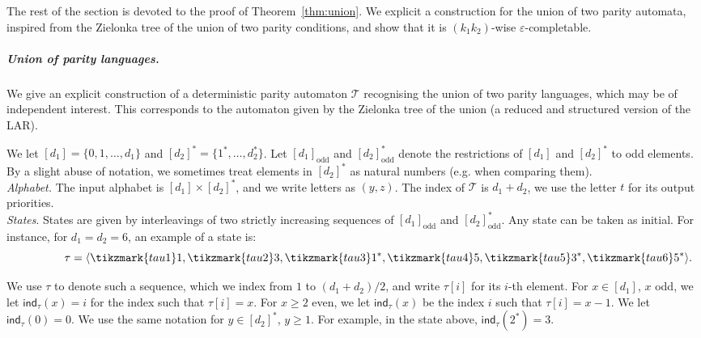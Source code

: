 \documentclass[a4paper,UKenglish,cleveref, thm-restate]{lipics-v2021}
\newcommand{\eps}{\varepsilon}
\newcommand{\T}{\mathcal T}
\newcommand{\done}{[d_1]}
\newcommand{\dtwo}{[d_2]^*}
\newcommand{\doneodd}{[d_1]_{\mathrm{odd}}}
\newcommand{\dtwoodd}{[d_2]^*_{\mathrm{odd}}}
\newcommand{\indtau}[1]{\mathsf{ind}_\tau(#1)}
\begin{document}
The rest of the section is devoted to the proof of Theorem~\ref{thm:union}.
We explicit a construction for the union of two parity automata, inspired from the Zielonka tree of the union of two parity conditions, and show that it is $(k_1 k_2)$-wise $\eps$-completable.



\subparagraph{Union of parity languages.} We give an explicit construction of a deterministic parity automaton $\mathcal{T}$ recognising the union of two parity languages, which may be of independent interest.  This corresponds to the automaton given by the Zielonka tree of the union (a reduced and structured version of the LAR).

We let $\done = \{0, 1,\dots,d_1\}$  and $\dtwo= \{1^*,\dots,d_2^*\}$.
Let $\doneodd$ and $\dtwoodd$ denote the restrictions of $\done$ and $\dtwo$ to odd elements.
By a slight abuse of notation, we sometimes treat elements in $\dtwo$ as natural numbers (e.g. when comparing them).\\

\textit{Alphabet.} 
The input alphabet is $\done \times \dtwo$, and we write letters as $(y,z)$. 
The index of $\T$  is $d_1 + d_2$, we use the letter $t$ for its output priorities.\\


\textit{States}. 
States are given by interleavings of two strictly increasing sequences of $\doneodd$ and $\dtwoodd$. Any state can be taken as initial. For instance, for $d_1=d_2=6$, an example of a state is:\\[-4mm]
\[  \hspace{15mm} \tau = \langle \tikzmark{tau1}1,\tikzmark{tau2}3,\tikzmark{tau3}1^*,\tikzmark{tau4}5, \tikzmark{tau5}3^*, \tikzmark{tau6}5^* \rangle .\]




\vspace{-2.5mm}

We use $\tau$ to denote such a sequence, which we index from $1$ to $(d_1+d_2)/2$, and write $\tau[i]$ for its $i$-th element.
For $x\in \done$, $x$ odd,  we let $\indtau{x} = i$ for the index such that $\tau[i]=x$. For $x\geq 2$ even, we let $\indtau{x}$ be the index $i$ such that $\tau[i]=x-1$. We let $\indtau{0} = 0$. We use the same notation for $y\in \dtwo$, $y\geq 1$. For example, in the state above, $\indtau{2^*}=3$.
\end{document}
